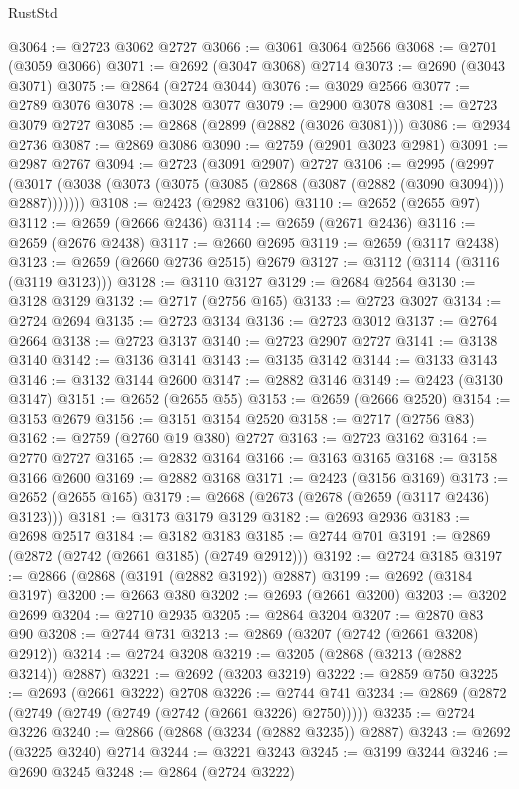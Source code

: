 \begin{lexlean}{RustStd}
\begin{coremodule}
{\begin{coremodule}
{{{{{{{{{{{{{{{{{{{{{{{{{{{{{{{{{{{{{{{@3064 := @2723 @3062 @2727
@3066 := @3061 @3064 @2566
@3068 := @2701 (@3059 @3066)
@3071 := @2692 (@3047 @3068) @2714
@3073 := @2690 (@3043 @3071)
@3075 := @2864 (@2724 @3044)
@3076 := @3029 @2566
@3077 := @2789 @3076
@3078 := @3028 @3077
@3079 := @2900 @3078
@3081 := @2723 @3079 @2727
@3085 := @2868 (@2899 (@2882 (@3026 @3081)))
@3086 := @2934 @2736
@3087 := @2869 @3086
@3090 := @2759 (@2901 @3023 @2981)
@3091 := @2987 @2767
@3094 := @2723 (@3091 @2907) @2727
@3106 := @2995
    (@2997 (@3017 (@3038 (@3073 (@3075 (@3085 (@2868 (@3087 (@2882 (@3090 @3094))) @2887)))))))
@3108 := @2423 (@2982 @3106)
@3110 := @2652 (@2655 @97)
@3112 := @2659 (@2666 @2436)
@3114 := @2659 (@2671 @2436)
@3116 := @2659 (@2676 @2438)
@3117 := @2660 @2695
@3119 := @2659 (@3117 @2438)
@3123 := @2659 (@2660 @2736 @2515) @2679
@3127 := @3112 (@3114 (@3116 (@3119 @3123)))
@3128 := @3110 @3127
@3129 := @2684 @2564
@3130 := @3128 @3129
@3132 := @2717 (@2756 @165)
@3133 := @2723 @3027
@3134 := @2724 @2694
@3135 := @2723 @3134
@3136 := @2723 @3012
@3137 := @2764 @2664
@3138 := @2723 @3137
@3140 := @2723 @2907 @2727
@3141 := @3138 @3140
@3142 := @3136 @3141
@3143 := @3135 @3142
@3144 := @3133 @3143
@3146 := @3132 @3144 @2600
@3147 := @2882 @3146
@3149 := @2423 (@3130 @3147)
@3151 := @2652 (@2655 @55)
@3153 := @2659 (@2666 @2520)
@3154 := @3153 @2679
@3156 := @3151 @3154 @2520
@3158 := @2717 (@2756 @83)
@3162 := @2759 (@2760 @19 @380) @2727
@3163 := @2723 @3162
@3164 := @2770 @2727
@3165 := @2832 @3164
@3166 := @3163 @3165
@3168 := @3158 @3166 @2600
@3169 := @2882 @3168
@3171 := @2423 (@3156 @3169)
@3173 := @2652 (@2655 @165)
@3179 := @2668 (@2673 (@2678 (@2659 (@3117 @2436) @3123)))
@3181 := @3173 @3179 @3129
@3182 := @2693 @2936
@3183 := @2698 @2517
@3184 := @3182 @3183
@3185 := @2744 @701
@3191 := @2869 (@2872 (@2742 (@2661 @3185) (@2749 @2912)))
@3192 := @2724 @3185
@3197 := @2866 (@2868 (@3191 (@2882 @3192)) @2887)
@3199 := @2692 (@3184 @3197)
@3200 := @2663 @380
@3202 := @2693 (@2661 @3200)
@3203 := @3202 @2699
@3204 := @2710 @2935
@3205 := @2864 @3204
@3207 := @2870 @83 @90
@3208 := @2744 @731
@3213 := @2869 (@3207 (@2742 (@2661 @3208) @2912))
@3214 := @2724 @3208
@3219 := @3205 (@2868 (@3213 (@2882 @3214)) @2887)
@3221 := @2692 (@3203 @3219)
@3222 := @2859 @750
@3225 := @2693 (@2661 @3222) @2708
@3226 := @2744 @741
@3234 := @2869 (@2872 (@2749 (@2749 (@2749 (@2742 (@2661 @3226) @2750)))))
@3235 := @2724 @3226
@3240 := @2866 (@2868 (@3234 (@2882 @3235)) @2887)
@3243 := @2692 (@3225 @3240) @2714
@3244 := @3221 @3243
@3245 := @3199 @3244
@3246 := @2690 @3245
@3248 := @2864 (@2724 @3222)
}}}}}}}}}}}}}}}}}}}}}}}}}}}}}}}}}}}}}}}
\end{coremodule}}
\end{coremodule}
\end{lexlean}
